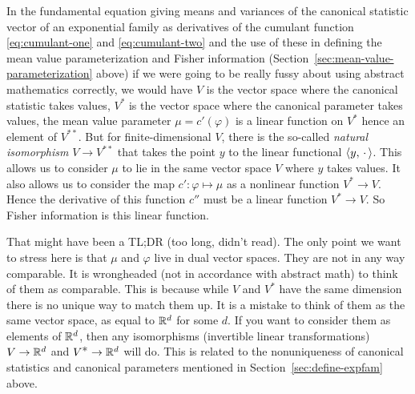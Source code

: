 In the fundamental equation giving means and variances of the canonical
statistic vector of an exponential family as derivatives of the cumulant
function \eqref{eq:cumulant-one} and \eqref{eq:cumulant-two} and the use
of these in defining the mean value parameterization and Fisher information
(Section~\ref{sec:mean-value-parameterization} above) if we were going to
be really fussy about using abstract mathematics correctly, we would have
$V$ is the vector space where the canonical statistic takes values,
$V^{\textstyle *}$ is the vector space where the canonical parameter
takes values,
the mean value parameter $\mu = c'(\varphi)$ is a linear function on
$V^{\textstyle *}$ hence an element of $V^{\textstyle {*}{*}}$.
But for finite-dimensional $V$, there is the so-called
\emph{natural isomorphism} $V \to V^{\textstyle {*}{*}}$ that takes the
point $y$ to the linear functional $\langle y, \,\cdot\, \rangle$.
This allows us to consider $\mu$ to lie in the same vector space $V$
where $y$ takes values.  It also allows us to consider the map
$c' : \varphi \mapsto \mu$ as a nonlinear function $V^{\textstyle *} \to V$.
Hence the derivative of this function $c''$ must be a linear function
$V^{\textstyle *} \to V$.  So Fisher information is this linear function.

That might have been a TL;DR (too long, didn't read).  The only point we
want to stress here is that $\mu$ and $\varphi$ live in dual vector spaces.
They are not in any way comparable.  It is wrongheaded (not in accordance
with abstract math) to think of them as comparable.  This is because
while $V$ and $V^{\textstyle *}$ have the same dimension
\citep[if finite-dimensional][Theorem~2 of Section~15]{halmos-vector-spaces}
there is no unique way to match them up.  It is a mistake to think of them
as the same vector space, as equal to $\mathbb{R}^d$ for some $d$.
If you want to consider them as elements of $\mathbb{R}^d$, then any isomorphisms
(invertible linear transformations) $V \to \mathbb{R}^d$
and $V^{\textstyle *} \to \mathbb{R}^d$ will do.  This is related to the
nonuniqueness of canonical statistics and canonical parameters mentioned
in Section~\ref{sec:define-expfam} above.

